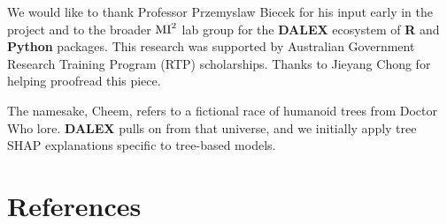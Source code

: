 \documentclass[
  article]{article}
\begin{document}
We would like to thank Professor Przemyslaw Biecek for his input early in the project and to the broader \(\text{MI}^\text2\) lab group for the \textbf{DALEX} ecosystem of \textbf{R} and \textbf{Python} packages. This research was supported by Australian Government Research Training Program (RTP) scholarships. Thanks to Jieyang Chong for helping proofread this piece.

The namesake, Cheem, refers to a fictional race of humanoid trees from Doctor Who lore. \textbf{DALEX} pulls on from that universe, and we initially apply tree SHAP explanations specific to tree-based models.

\hypertarget{references}{%
\section*{References}\label{references}}
\end{document}
